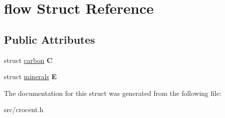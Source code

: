 \hypertarget{structflow}{\section{flow Struct Reference}
\label{structflow}
}
\subsection*{Public Attributes}
\begin{DoxyCompactItemize}
\item 
\hypertarget{structflow_ac7607521024f24c39483ba8d778668fc}{struct \hyperlink{structcarbon}{carbon} {\bfseries C}}\label{structflow_ac7607521024f24c39483ba8d778668fc}

\item 
\hypertarget{structflow_a761429ddbc2aa4fbab6ca0e58cfc90f2}{struct \hyperlink{structminerals}{minerals} {\bfseries E}}\label{structflow_a761429ddbc2aa4fbab6ca0e58cfc90f2}

\end{DoxyCompactItemize}


The documentation for this struct was generated from the following file\-:\begin{DoxyCompactItemize}
\item 
src/crocent.\-h\end{DoxyCompactItemize}
